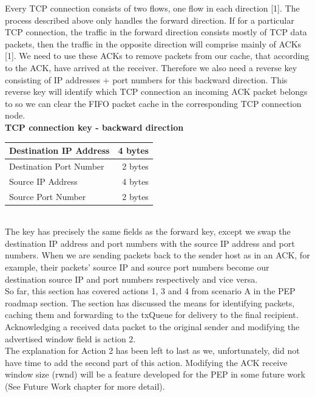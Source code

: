 \documentclass{uathesis}
\begin{document}
Every TCP connection consists of two flows, one flow in each direction [1]. The process described above only handles the forward direction. If for a particular TCP connection, the traffic in the forward direction consists mostly of TCP data packets, then the traffic in the opposite direction will comprise mainly of ACKs [1]. We need to use these ACKs to remove packets from our cache, that according to the ACK, have arrived at the receiver. Therefore we also need a reverse key consisting of IP addresses + port numbers for this backward direction. This reverse key will identify which TCP connection an incoming ACK packet belongs to so we can clear the FIFO packet cache in the corresponding TCP connection node. \\

\textbf{TCP connection key - backward direction} \\

\begin{tabular}{|l|r|}
	\hline
    Destination IP Address & 4 bytes\\
	\hline
    Destination Port Number & 2 bytes\\
    \hline 
    Source IP Address & 4 bytes\\
	\hline
    Source Port Number & 2 bytes\\
	\hline
\end{tabular} \\

The key has precisely the same fields as the forward key, except we swap the destination IP address and port numbers with the source IP address and port numbers. When we are sending packets back to the sender host as in an ACK, for example, their packets' source IP and source port numbers become our destination source IP and port numbers respectively and vice versa. \\

So far, this section has covered actions 1, 3 and 4 from scenario A in the PEP roadmap section. The section has discussed the means for identifying packets, caching them and forwarding to the txQueue for delivery to the final recipient. Acknowledging a received data packet to the original sender and modifying the advertised window field is action 2. \\

The explanation for Action 2 has been left to last as we, unfortunately, did not have time to add the second part of this action. Modifying the ACK receive window size (rwnd) will be a feature developed for the PEP in some future work (See Future Work chapter for more detail). \\
\end{document}
